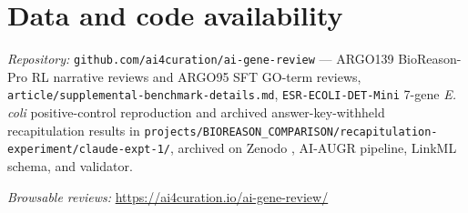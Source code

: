 \documentclass[
  11pt,
]{article}
\begin{document}
\hypertarget{data-and-code-availability}{%
\section{Data and code
availability}\label{data-and-code-availability}}

\emph{Repository:} \texttt{github.com/ai4curation/ai-gene-review} ---
ARGO139 BioReason-Pro RL narrative reviews and ARGO95 SFT GO-term reviews,
\texttt{article/supplemental-benchmark-details.md},
\texttt{ESR-ECOLI-DET-Mini} 7-gene \emph{E. coli} positive-control
reproduction and archived answer-key-withheld recapitulation results in
\texttt{projects/BIOREASON\_COMPARISON/recapitulation-experiment/claude-expt-1/},
archived on Zenodo \cite{mungall2026esrecolidetmini}, AI-AUGR pipeline,
LinkML schema, and validator.

\emph{Browsable reviews:}
\url{https://ai4curation.io/ai-gene-review/}



\end{document}
